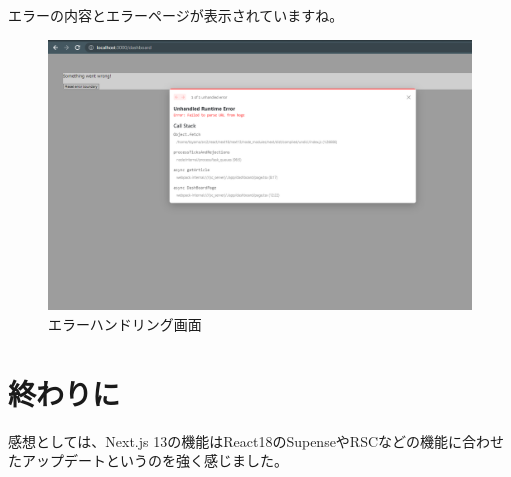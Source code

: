 エラーの内容とエラーページが表示されていますね。


\begin{figure}[H]
  \centering
  \includegraphics[width=12cm]{./image/03-Tech/chap4/08.png}
  \caption{エラーハンドリング画面}
\end{figure}



\section{終わりに}
感想としては、Next.js 13の機能はReact18のSupenseやRSCなどの機能に合わせたアップデートというのを強く感じました。
